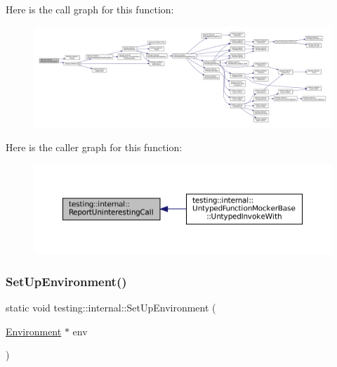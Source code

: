 Here is the call graph for this function\+:
\nopagebreak
\begin{figure}[H]
\begin{center}
\leavevmode
\includegraphics[width=350pt]{namespacetesting_1_1internal_a8d99a1e87d0cea563b2bfad8a4e65276_cgraph}
\end{center}
\end{figure}
Here is the caller graph for this function\+:
\nopagebreak
\begin{figure}[H]
\begin{center}
\leavevmode
\includegraphics[width=350pt]{namespacetesting_1_1internal_a8d99a1e87d0cea563b2bfad8a4e65276_icgraph}
\end{center}
\end{figure}
\mbox{\label{namespacetesting_1_1internal_a5f5535012d4548788a5d1a4e0f18e19e}} 
\subsubsection{\texorpdfstring{Set\+Up\+Environment()}{SetUpEnvironment()}}
{\footnotesize\ttfamily static void testing\+::internal\+::\+Set\+Up\+Environment (\begin{DoxyParamCaption}\item[{\hyperlink{classtesting_1_1Environment}{Environment} $\ast$}]{env }\end{DoxyParamCaption})\hspace{0.3cm}{\ttfamily [static]}}



